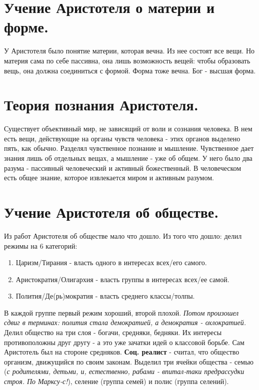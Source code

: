 \documentclass[12pt,a4paper]{article}
\begin{document}
\section{Учение Аристотеля о материи и форме.}
У Аристотеля было понятие материи, которая вечна. Из нее состоят все вещи. Но материя сама по себе пассивна, она лишь возможность вещей: чтобы образовать вещь, она должна соединиться с формой. Форма тоже вечна. Бог - высшая форма.

\section{Теория познания Аристотеля.}
Существует объективный мир, не зависящий от воли и сознания человека. В нем есть вещи, действующие на органы чувств человека - этих органов выделено пять, как обычно.
Разделял чувственное познание и мышление. Чувственное дает знания лишь об отдельных вещах, а мышление - уже об общем. У него было два разума - пассивный человеческий и активный божественный. 
В человеческом есть общее знание, которое извлекается миром и активным разумом. 

\section{Учение Аристотеля об обществе.}
Из работ Аристотеля об обществе мало что дошло. Из того что дошло: делил режимы на 6 категорий:
\begin{enumerate}
\item Царизм/Тирания - власть одного в интересах всех/его самого.
\item Аристократия/Олигархия - власть группы в интересах всех/ее самой.
\item Полития/Де(рь)мократия  - власть среднего классы/толпы.
\end{enumerate}
В каждой группе первый режим хороший, второй плохой. \textit{Потом произошел сдвиг в терминах: полития стала демократией, а демократия - охлократией.}
Делил общество на три слоя - богачи, средняки, бедняки. Их интересы противоположны друг другу - а это уже зачатки идей о классовой борьбе. Сам Аристотель был на стороне средняков. \textbf{Соц. реалист} - считал, что общество организм, движущийся по своим законам. Выделил три ячейки общества - семью (\textit{с родителями, детьми, и, естественно, рабами - впитал-таки предрассудки строя. По Марксу-с!}), селение (группа семей) и полис (группа селений).
\end{document}
